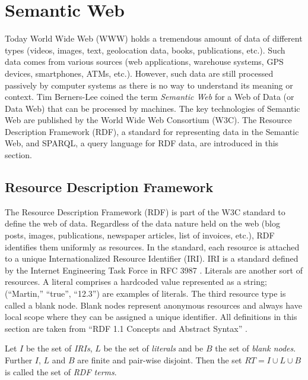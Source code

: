\section{Semantic Web}
\label{sec:preliminaries:semanticweb}

Today World Wide Web (WWW) holds a tremendous amount of data of different types (videos,
images, text, geolocation data, books, publications, etc.). Such data comes from various sources
(web applications, warehouse systems, GPS devices, smartphones, ATMs, etc.). However, such
data are still processed passively by computer systems as there is no way to understand its meaning or context.
Tim Berners-Lee coined the term \textit{Semantic Web} for a Web of Data (or Data Web) \cite{LeeWeavingTheWeb} that can be processed by machines.   
The key technologies of Semantic Web are published by the World Wide Web Consortium (W3C). 
The Resource Description Framework (RDF), a standard for representing data in the Semantic Web, and SPARQL, a query language for RDF data, are introduced in this section.

\subsection{Resource Description Framework}
\label{sec:rdf}
The Resource Description Framework (RDF) \cite{rdfonline} is part of the W3C standard to define the web of data. Regardless of the data nature held on the web (blog posts, images, publications, newspaper articles,  list of invoices, etc.), RDF identifies them uniformly as resources. In the standard, each resource is attached to a unique Internationalized Resource Identifier (IRI). IRI is a standard defined by the Internet Engineering Task Force in RFC 3987 \cite{rfc3987}. Literals are another sort of resources. A literal comprises a hardcoded value represented as a string; (“Martin,” “true”, “12.3”) are examples of literals. The third resource type is called a blank node. Blank nodes represent anonymous resources and always have local scope where they can be assigned a unique identifier. All definitions in this section are taken from “RDF 1.1 Concepts and Abstract Syntax” \cite{RDF11}. \\

\begin{definition}
Let $I$ be the set of \textit{IRIs}, $L$ be the set of \textit{literals} and be $B$ the set of
\textit{blank nodes}. Further $I$, $L$ and $B$ are finite and pair-wise disjoint. Then the set $RT = I \cup L \cup B$ is called the set of \textit{RDF terms}. 
\end{definition}

